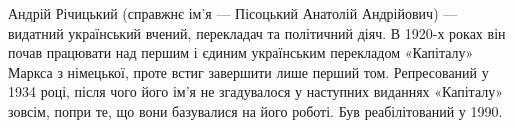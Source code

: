 
Андрій Річицький (справжнє ім'я — Пісоцький Анатолій Андрійович) — видатний український вчений, перекладач та політичний діяч. В 1920-х роках він почав працювати над першим і єдиним українським перекладом «Капіталу» Маркса з німецької, проте встиг завершити лише перший том. Репресований у 1934 році, після чого його ім’я не згадувалося у наступних виданнях «Капіталу» зовсім, попри те, що вони базувалися на його роботі. Був реабілітований у 1990.
